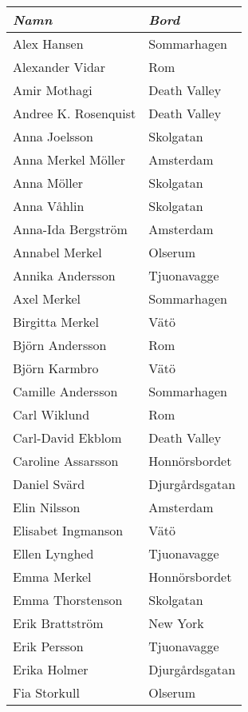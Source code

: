 \documentclass[12.0pt]{extarticle}
\begin{document}
	
\pagestyle{empty}

\fontsize{12}{16}\selectfont
\begin{center}
	
\begin{tabular}{l  l}
\textbf{\textit{Namn}}	&	\textbf{\textit{Bord}} \\ \hline
Alex Hansen	&	Sommarhagen	\\ \hline
Alexander Vidar	&	Rom	\\ \hline
Amir Mothagi	&	Death Valley	\\ \hline
Andree K. Rosenquist	&	Death Valley	\\ \hline
Anna Joelsson	&	Skolgatan	\\ \hline
Anna Merkel Möller	&	Amsterdam	\\ \hline
Anna Möller	&	Skolgatan	\\ \hline
Anna Våhlin	&	Skolgatan	\\ \hline
Anna-Ida Bergström	&	Amsterdam	\\ \hline
Annabel Merkel	&	Olserum	\\ \hline
Annika Andersson	&	Tjuonavagge	\\ \hline
Axel Merkel	&	Sommarhagen	\\ \hline
Birgitta Merkel	&	Vätö	\\ \hline
Björn Andersson	&	Rom	\\ \hline
Björn Karmbro	&	Vätö	\\ \hline
Camille Andersson	&	Sommarhagen	\\ \hline
Carl Wiklund	&	Rom	\\ \hline
Carl-David Ekblom	&	Death Valley	\\ \hline
Caroline Assarsson	&	Honnörsbordet	\\ \hline
Daniel Svärd	&	Djurgårdsgatan	\\ \hline
Elin Nilsson	&	Amsterdam	\\ \hline
Elisabet Ingmanson	&	Vätö	\\ \hline
Ellen Lynghed	&	Tjuonavagge	\\ \hline
Emma Merkel	&	Honnörsbordet	\\ \hline
Emma Thorstenson	&	Skolgatan	\\ \hline
Erik Brattström	&	New York	\\ \hline
Erik Persson	&	Tjuonavagge	\\ \hline
Erika Holmer	&	Djurgårdsgatan	\\ \hline
Fia Storkull	&	Olserum	\\ \hline

\end{tabular}
\end{center}
\end{document}
